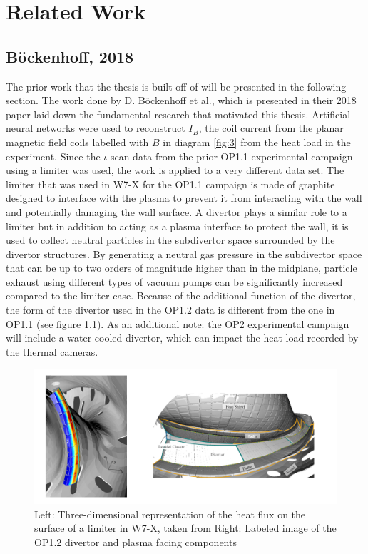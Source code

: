 %
\chapter{Related Work}
\label{sec:related}

\section{Böckenhoff, 2018}
The prior work that the thesis is built off of will be presented in the following section. The work done by D. Böckenhoff et al., which is presented in their 2018 paper \cite{Böckenhoff_2018} laid down the fundamental research that motivated this thesis. Artificial neural networks were used to reconstruct $I_B$, the coil current from the planar magnetic field coils labelled with $B$ in diagram \ref{fig:3} from the heat load in the experiment. Since the $\iota$-scan data from the prior OP1.1 experimental campaign using a limiter was used, the work is applied to a very different data set. The limiter that was used in W7-X for the OP1.1 campaign is made of graphite designed to interface with the plasma to prevent it from interacting with the wall and potentially damaging the wall surface. A divertor plays a similar role to a limiter but in addition to acting as a plasma interface to protect the wall, it is used to collect neutral particles in the subdivertor space surrounded by the divertor structures. By generating a neutral gas pressure in the subdivertor space that can be up to two orders of magnitude higher than in the midplane, particle exhaust using different types of vacuum pumps can be significantly increased compared to the limiter case. Because of the additional function of the divertor, the form of the divertor used in the OP1.2 data is different  from the one in OP1.1 (see figure \ref{fig:limiter-divertor}). As an additional note: the OP2 experimental campaign will include a water cooled divertor, which can impact the heat load recorded by the thermal cameras.

\begin{figure}[!htb]
    \centering
    \includegraphics[width = \textwidth]{images/limiter-divetor.png}
    \caption{Left: Three-dimensional representation of the heat flux on the surface of a limiter in W7-X, taken from \cite{Böckenhoff_2018} Right: Labeled image of the OP1.2 divertor and plasma facing components} \label{fig:limiter-divertor}
\end{figure}

